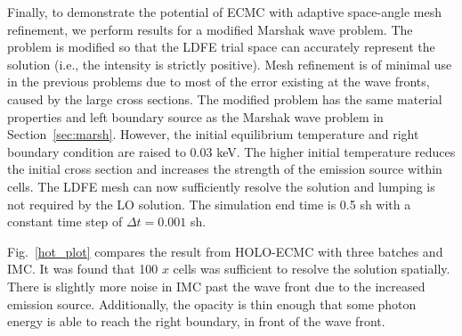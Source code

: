\documentclass[12pt]{article}
\newcommand{\Dt}{\Delta t}
\begin{document}
\begin{center}
Finally, to demonstrate the potential of ECMC with adaptive space-angle mesh refinement, we perform
results for a modified Marshak wave problem. The problem is modified so that the LDFE
trial space can accurately represent the solution (i.e., the intensity is strictly
positive).  Mesh refinement is of minimal use in the previous problems due to most of
the error existing at the wave fronts, caused by the large cross sections.   The modified problem has the same material
properties and left boundary source as the Marshak wave problem in
Section~\ref{sec:marsh}.  However, the initial equilibrium
temperature and right boundary condition are raised to $0.03$ keV.   The higher initial temperature reduces the
initial cross section and increases the strength of the emission source within cells.  
The LDFE mesh can now sufficiently resolve the solution and lumping is
not required by the LO solution.  The simulation end time is 0.5 sh with a constant
time step of $\Dt=0.001$ sh.  

Fig.~\ref{hot_plot} compares the result from HOLO-ECMC with three batches and IMC.
It was found that 100 $x$ cells was sufficient to resolve the solution spatially. There is slightly more noise in IMC past the wave front due to the increased emission
source.  Additionally, the opacity is thin enough that some photon energy is able to
reach the right boundary, in front of the wave front. 


\end{center}
\end{document}
